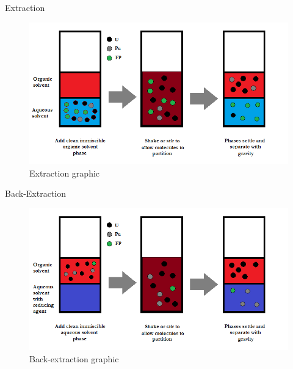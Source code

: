 \documentclass{beamer}
\begin{document}
\begin{frame}{Extraction}
  \begin{figure}[H]
    \vspace*{0.1cm}
    \begin{center}
      \includegraphics[scale = 0.5]{Extraction}
      \vspace{-0.7cm}
      \caption{\tiny{Extraction graphic}}
    \end{center}
  \end{figure}
\end{frame}

\begin{frame}{Back-Extraction}
  \begin{figure}[H]
    \vspace*{0.1cm}
    \begin{center}
      \includegraphics[scale = 0.5]{Back_Extraction}
      \vspace{-0.7cm}
      \caption{\tiny{Back-extraction graphic}}
    \end{center}
  \end{figure}
\end{frame}
\end{document}
